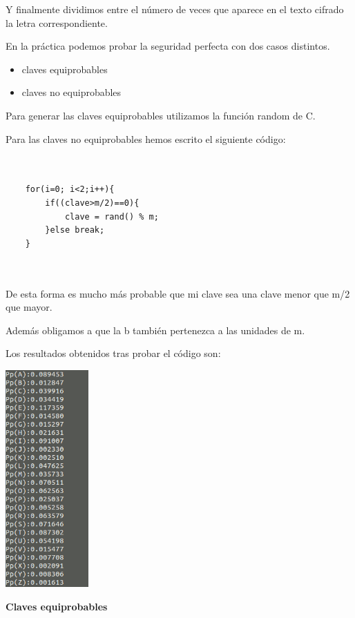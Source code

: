 \documentclass{apuntes}
\begin{document}
Y finalmente dividimos entre el número de veces que aparece en el texto cifrado la letra correspondiente.

En la práctica podemos probar la seguridad perfecta con dos casos distintos.

\begin{itemize}
	\item claves equiprobables
	\item claves no equiprobables
\end{itemize}

Para generar las claves equiprobables utilizamos la función random de C.

Para las claves no equiprobables hemos escrito el siguiente código:


\begin{lstlisting}


	for(i=0; i<2;i++){
		if((clave>m/2)==0){
			clave = rand() % m;
		}else break;
	}
	
	
\end{lstlisting}



De esta forma es mucho más probable que mi clave sea una clave menor que m/2 que mayor. 

Además obligamos a que la b también pertenezca a las unidades de m.

Los resultados obtenidos tras probar el código son:

\begin{center}
	\includegraphics[width=90pt]{ProbabilidadesSimp.png}
\end{center}


\newpage
\textbf{Claves equiprobables}
\end{document}
